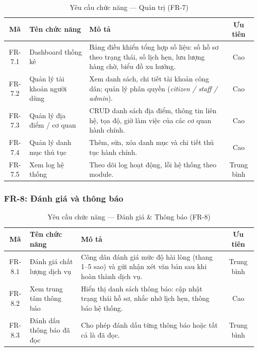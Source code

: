 \begin{table}[H]
\centering
\caption{Yêu cầu chức năng — Quản trị (FR-7)}
\label{tab:fr-admin}
\begin{tabularx}{\textwidth}{|c|l|X|c|}
\hline
\textbf{Mã} & \textbf{Tên chức năng} & \textbf{Mô tả} & \textbf{Ưu tiên} \\
\hline
FR-7.1 & Dashboard thống kê &
  Bảng điều khiển tổng hợp số liệu: số hồ sơ theo trạng thái,
  số lịch hẹn, lưu lượng hàng chờ, biểu đồ xu hướng. &
  Cao \\
\hline
FR-7.2 & Quản lý tài khoản người dùng &
  Xem danh sách, chi tiết tài khoản công dân; quản lý phân quyền
  (\textit{citizen / staff / admin}). &
  Cao \\
\hline
FR-7.3 & Quản lý địa điểm / cơ quan &
  CRUD danh sách địa điểm, thông tin liên hệ, tọa độ, giờ làm việc
  của các cơ quan hành chính. &
  Cao \\
\hline
FR-7.4 & Quản lý danh mục thủ tục &
  Thêm, sửa, xóa danh mục và chi tiết thủ tục hành chính. &
  Cao \\
\hline
FR-7.5 & Xem log hệ thống &
  Theo dõi log hoạt động, lỗi hệ thống theo module. &
  Trung bình \\
\hline
\end{tabularx}
\end{table}

\subsubsection{FR-8: Đánh giá và thông báo}

\begin{table}[H]
\centering
\caption{Yêu cầu chức năng — Đánh giá \& Thông báo (FR-8)}
\label{tab:fr-eval}
\begin{tabularx}{\textwidth}{|c|l|X|c|}
\hline
\textbf{Mã} & \textbf{Tên chức năng} & \textbf{Mô tả} & \textbf{Ưu tiên} \\
\hline
FR-8.1 & Đánh giá chất lượng dịch vụ &
  Công dân đánh giá mức độ hài lòng (thang 1–5 sao) và gửi
  nhận xét văn bản sau khi hoàn thành dịch vụ. &
  Trung bình \\
\hline
FR-8.2 & Xem trung tâm thông báo &
  Hiển thị danh sách thông báo: cập nhật trạng thái hồ sơ,
  nhắc nhở lịch hẹn, thông báo hệ thống. &
  Cao \\
\hline
FR-8.3 & Đánh dấu thông báo đã đọc &
  Cho phép đánh dấu từng thông báo hoặc tất cả là đã đọc. &
  Trung bình \\
\hline
\end{tabularx}
\end{table}


